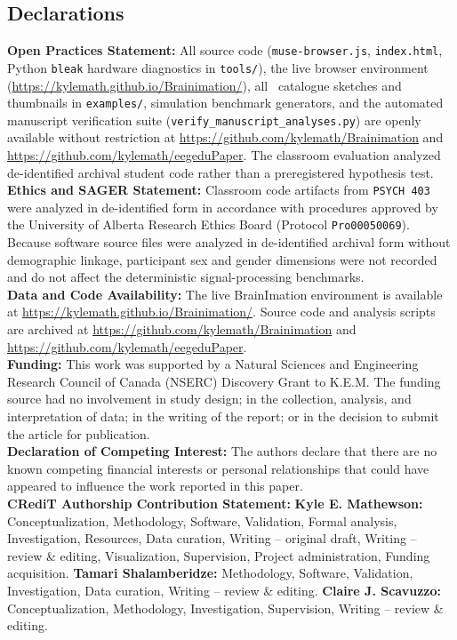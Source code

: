 \documentclass[11pt]{article}
\begin{document}
\subsection*{Declarations}
\noindent\textbf{Open Practices Statement:} All source code (\texttt{muse-browser.js}, \texttt{index.html}, Python \texttt{bleak} hardware diagnostics in \texttt{tools/}), the live browser environment (\url{https://kylemath.github.io/Brainimation/}), all \NCatalogueSketches\ catalogue sketches and thumbnails in \texttt{examples/}, simulation benchmark generators, and the automated manuscript verification suite (\texttt{verify\_manuscript\_analyses.py}) are openly available without restriction at \url{https://github.com/kylemath/Brainimation} and \url{https://github.com/kylemath/eegeduPaper}. The classroom evaluation analyzed de-identified archival student code rather than a preregistered hypothesis test.\\[2pt]
\noindent\textbf{Ethics and SAGER Statement:} Classroom code artifacts from \texttt{PSYCH 403} were analyzed in de-identified form in accordance with procedures approved by the University of Alberta Research Ethics Board (Protocol \texttt{Pro00050069}). Because software source files were analyzed in de-identified archival form without demographic linkage, participant sex and gender dimensions were not recorded and do not affect the deterministic signal-processing benchmarks.\\[2pt]
\noindent\textbf{Data and Code Availability:} The live BrainImation environment is available at \url{https://kylemath.github.io/Brainimation/}. Source code and analysis scripts are archived at \url{https://github.com/kylemath/Brainimation} and \url{https://github.com/kylemath/eegeduPaper}.\\[2pt]
\noindent\textbf{Funding:} This work was supported by a Natural Sciences and Engineering Research Council of Canada (NSERC) Discovery Grant to K.E.M. The funding source had no involvement in study design; in the collection, analysis, and interpretation of data; in the writing of the report; or in the decision to submit the article for publication.\\[2pt]
\noindent\textbf{Declaration of Competing Interest:} The authors declare that there are no known competing financial interests or personal relationships that could have appeared to influence the work reported in this paper.\\[2pt]
\noindent\textbf{CRediT Authorship Contribution Statement:} \textbf{Kyle E. Mathewson:} Conceptualization, Methodology, Software, Validation, Formal analysis, Investigation, Resources, Data curation, Writing -- original draft, Writing -- review \& editing, Visualization, Supervision, Project administration, Funding acquisition. \textbf{Tamari Shalamberidze:} Methodology, Software, Validation, Investigation, Data curation, Writing -- review \& editing. \textbf{Claire J. Scavuzzo:} Conceptualization, Methodology, Investigation, Supervision, Writing -- review \& editing.\\[2pt]
\end{document}
